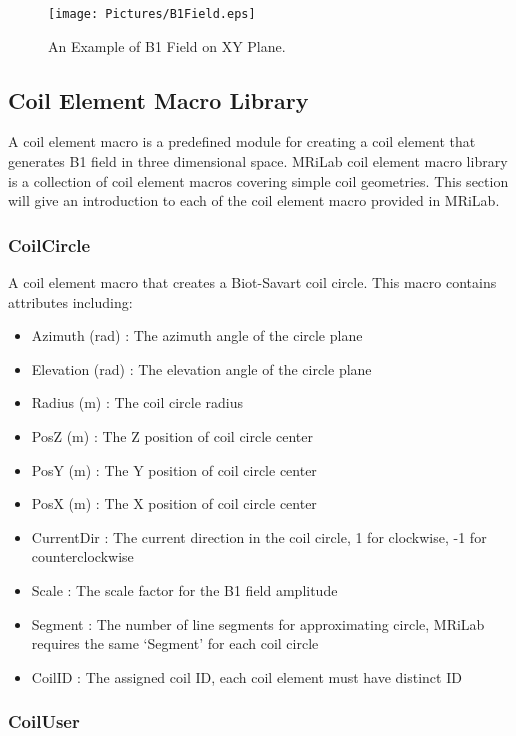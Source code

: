 \documentclass{book}%
\begin{document}
\begin{figure}[htbp]
	\centering
		\texttt{[image: Pictures/B1Field.eps]}
	\caption{An Example of B1 Field on XY Plane.}
	\label{fig:B1Field}
\end{figure}


\subsection{Coil Element Macro Library}

A coil element macro is a predefined module for creating a coil element that generates B1 field in three dimensional space. MRiLab coil element macro library is a collection of coil element macros covering simple coil geometries. This section will give an introduction to each of the coil element macro provided in MRiLab.

\subsubsection{CoilCircle}

A coil element macro that creates a Biot-Savart coil circle. This macro contains attributes including:

\begin{itemize}
	\item Azimuth (rad) : The azimuth angle of the circle plane
	\item Elevation (rad) : The elevation angle of the circle plane
	\item Radius (m) : The coil circle radius
	\item PosZ (m) : The Z position of coil circle center
  \item PosY (m) : The Y position of coil circle center
	\item PosX (m) : The X position of coil circle center
	\item CurrentDir : The current direction in the coil circle, 1 for clockwise, -1 for counterclockwise
	\item Scale : The scale factor for the B1 field amplitude
	\item Segment : The number of line segments for approximating circle, MRiLab requires the same `Segment' for each coil circle
	\item CoilID : The assigned coil ID, each coil element must have distinct ID
\end{itemize}

\subsubsection{CoilUser}
\end{document}
